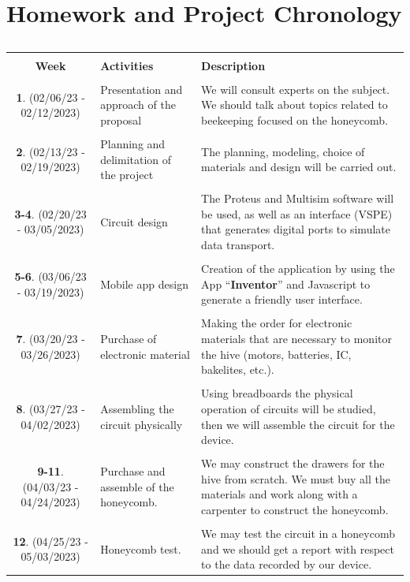 \documentclass[12pt]{report}
\begin{document}
	\section{Homework and Project Chronology}
	
	\begin{table}[h!]
		\centering
		\caption[Homework and Project Chronology]{}
		\begin{tabular}{||c|m{4cm}|m{7cm}||}
			\hline
			&&\\ [-1.8ex]
			\textbf{Week} & \textbf{Activities} & \textbf{Description} \\ [0.5ex] \hline
			&&\\ [-1.8ex]
			\textbf{1}. (02/06/23 - 02/12/2023) & Presentation and approach of the proposal & We will consult experts on the subject. We should talk about topics related to beekeeping focused on the honeycomb. \\ [0.5ex] \hline &&\\ [-1.8ex]
			\textbf{2}. (02/13/23 - 02/19/2023) & Planning and delimitation of the project & The planning, modeling, choice of materials and design will be carried out. \\ [0.5ex] \hline &&\\ [-1.8ex]
			\textbf{3-4}. (02/20/23 - 03/05/2023) & Circuit design & The Proteus and Multisim software will be used, as well as an interface (VSPE) that generates digital ports to simulate data transport. \\ [0.5ex] \hline &&\\ [-1.8ex]
			\textbf{5-6}. (03/06/23 - 03/19/2023) & Mobile app design & Creation of the application by using the App ``\textbf{Inventor}'' and Javascript to generate a friendly user interface. \\ [0.5ex] \hline &&\\ [-1.8ex]
			\textbf{7}. (03/20/23 - 03/26/2023) & Purchase of electronic material & Making the order for electronic materials that are necessary to monitor the hive (motors, batteries, IC, bakelites, etc.). \\ [0.5ex] \hline &&\\ [-1.8ex]
			\textbf{8}. (03/27/23 - 04/02/2023) & Assembling the circuit physically & Using breadboards the physical operation of circuits will be studied, then we will assemble the circuit for the device. \\ [0.5ex] \hline &&\\ [-1.8ex]
			\textbf{9-11}. (04/03/23 - 04/24/2023) & Purchase and assemble of the honeycomb. & We may construct the drawers for the hive from scratch. We must buy all the materials and work along with a carpenter to construct the honeycomb. \\ [0.5ex] \hline &&\\ [-1.8ex]
			\textbf{12}. (04/25/23 - 05/03/2023) & Honeycomb test. & We may test the circuit in a honeycomb and we should get a report with respect to the data recorded by our device. \\ [0.5ex] \hline 
		\end{tabular}
	\end{table}
	
\end{document}
